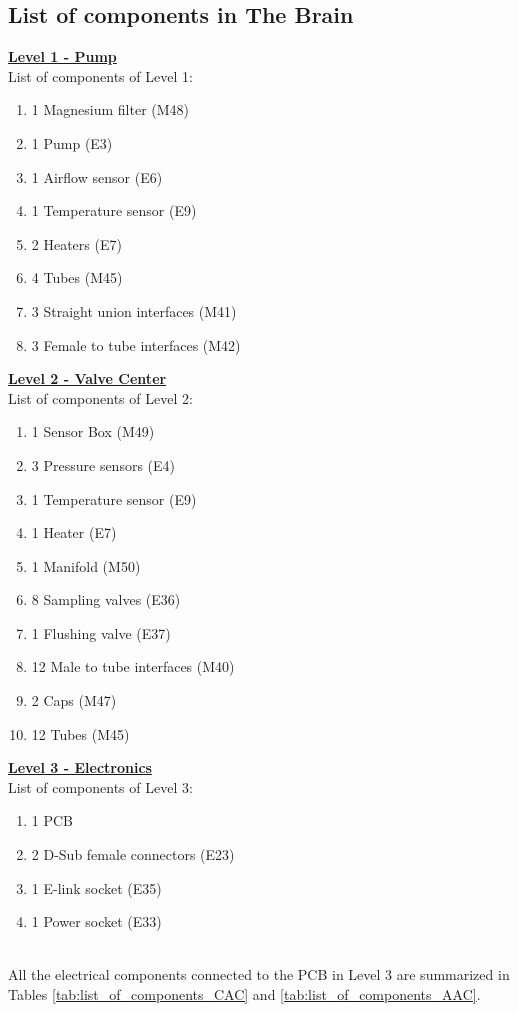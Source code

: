 \subsection{List of components in The Brain}
\label{list-of-components-brain}
\textbf{\underline{Level 1 - Pump}}
\\
List of components of Level 1:

\begin{enumerate}[label=\Alph*.]
    \item 1 Magnesium filter (M48)
    \item 1 Pump (E3)
    \item 1 Airflow sensor (E6)
    \item 1 Temperature sensor (E9)
    \item 2 Heaters (E7)
    \item 4 Tubes (M45)
    \item 3 Straight union interfaces (M41)
    \item 3 Female to tube interfaces (M42)
\end{enumerate}

\textbf{\underline{Level 2 - Valve Center}}
\\
List of components of Level 2:

\begin{enumerate}[label=\Alph*.]
    \item 1 Sensor Box (M49)
    \item 3 Pressure sensors (E4)
    \item 1 Temperature sensor (E9)
    \item 1 Heater (E7)
    \item 1 Manifold (M50)
    \item 8 Sampling valves (E36)
    \item 1 Flushing valve (E37)
    \item 12 Male to tube interfaces (M40)
    \item 2 Caps (M47)
    \item 12 Tubes (M45)
\end{enumerate}

\textbf{\underline{Level 3 - Electronics}}
\\
List of components of Level 3:
\begin{enumerate}[label=\Alph*.]
    \item 1 PCB
    \item 2 D-Sub female connectors (E23)
    \item 1 E-link socket (E35)
    \item 1 Power socket (E33)
\end{enumerate}
\\
All the electrical components connected to the PCB in Level 3 are summarized in Tables \ref{tab:list_of_components_CAC} and \ref{tab:list_of_components_AAC}. 


